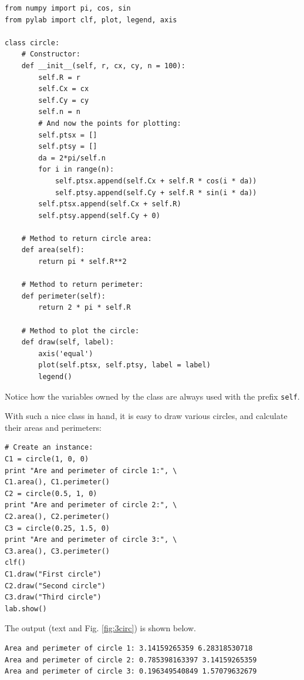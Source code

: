\begin{verbatim}
from numpy import pi, cos, sin
from pylab import clf, plot, legend, axis

class circle:
    # Constructor:
    def __init__(self, r, cx, cy, n = 100):
        self.R = r
        self.Cx = cx
        self.Cy = cy
        self.n = n
        # And now the points for plotting:
        self.ptsx = []
        self.ptsy = []
        da = 2*pi/self.n
        for i in range(n):
            self.ptsx.append(self.Cx + self.R * cos(i * da))
            self.ptsy.append(self.Cy + self.R * sin(i * da))
        self.ptsx.append(self.Cx + self.R)
        self.ptsy.append(self.Cy + 0)
            
    # Method to return circle area:
    def area(self):
        return pi * self.R**2
      
    # Method to return perimeter:
    def perimeter(self):
        return 2 * pi * self.R
      
    # Method to plot the circle:
    def draw(self, label):
        axis('equal')
        plot(self.ptsx, self.ptsy, label = label)
        legend()
\end{verbatim}
Notice how the variables owned by the class are always used with the 
prefix {\tt self}.

With such a nice class in hand, it is easy to draw various circles,
and calculate their areas and perimeters:
\begin{verbatim}        
# Create an instance:
C1 = circle(1, 0, 0)
print "Are and perimeter of circle 1:", \
C1.area(), C1.perimeter()
C2 = circle(0.5, 1, 0)
print "Are and perimeter of circle 2:", \
C2.area(), C2.perimeter()
C3 = circle(0.25, 1.5, 0)
print "Are and perimeter of circle 3:", \
C3.area(), C3.perimeter()
clf()
C1.draw("First circle")
C2.draw("Second circle")
C3.draw("Third circle")
lab.show()
\end{verbatim}
The output (text and Fig. \ref{fig:3circ}) is shown below.

\begin{verbatim}
Area and perimeter of circle 1: 3.14159265359 6.28318530718
Area and perimeter of circle 2: 0.785398163397 3.14159265359
Area and perimeter of circle 3: 0.196349540849 1.57079632679
\end{verbatim}

